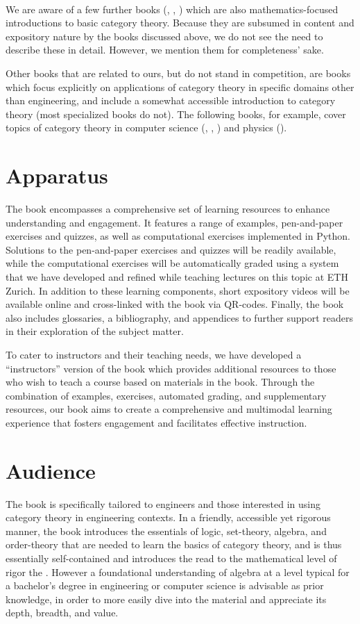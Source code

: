 \documentclass[10pt, article, one side]{memoir}
\begin{document}
    \

    We are aware of a few further books (\cite{Grandis}, \cite{Roman}, \cite{Simmons}) which are also mathematics-focused introductions to basic category theory.
    Because they are subsumed in content and expository nature by the books discussed above, we do not see the need to describe these in detail.
    However, we mention them for completeness' sake.

    Other books that are related to ours, but do not stand in competition, are books which focus explicitly on applications of category theory in specific domains other than engineering, and include a somewhat accessible introduction to category theory (most specialized books do not).
    The following books, for example, cover topics of category theory in computer science (\cite{BarrWells},  \cite{Milewski}, \cite{Pierce}) and physics (\cite{CoeckeKisssinger}).

    \section{Apparatus}
    The book encompasses a comprehensive set of learning resources to enhance understanding and engagement. It features a range of examples, pen-and-paper exercises and quizzes, as well as computational exercises implemented in Python. Solutions to the pen-and-paper exercises and quizzes will be readily available, while the computational exercises will be automatically graded using a system that we have developed and refined while teaching lectures on this topic at ETH Zurich. In addition to these learning components, short expository videos will be available online and cross-linked with the book via QR-codes. Finally, the book also includes glossaries, a bibliography, and appendices to further support readers in their exploration of the subject matter.

    To cater to instructors and their teaching needs, we have developed a ``instructors'' version of the book which provides additional resources to those who wish to teach a course based on materials in the book. Through the combination of examples, exercises, automated grading, and supplementary resources, our book aims to create a comprehensive and multimodal learning experience that fosters engagement and facilitates effective instruction.

    \section{Audience}
    The book is specifically tailored to engineers and those interested in using category theory in engineering contexts. In a friendly, accessible yet rigorous manner, the book introduces the essentials of logic, set-theory, algebra, and order-theory that are needed to learn the basics of category theory, and is thus essentially self-contained and introduces the read to the mathematical level of rigor the . However a foundational understanding of algebra at a level typical for a bachelor's degree in engineering or computer science is advisable as prior knowledge, in order to more easily dive into the material and appreciate its depth, breadth, and value. 
\end{document}
